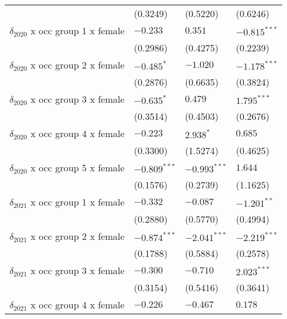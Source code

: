 \begin{tabular}{llll}
                                         &           (0.3249) &           (0.5220) &           (0.6246) \\
$\delta_{2020}$ x occ group 1 x female   &           $-0.233$ &            $0.351$ &     $-0.815^{***}$ \\
                                         &           (0.2986) &           (0.4275) &           (0.2239) \\
$\delta_{2020}$ x occ group 2 x female   &         $-0.485^*$ &           $-1.020$ &     $-1.178^{***}$ \\
                                         &           (0.2876) &           (0.6635) &           (0.3824) \\
$\delta_{2020}$ x occ group 3 x female   &         $-0.635^*$ &            $0.479$ &      $1.795^{***}$ \\
                                         &           (0.3514) &           (0.4503) &           (0.2676) \\
$\delta_{2020}$ x occ group 4 x female   &           $-0.223$ &          $2.938^*$ &            $0.685$ \\
                                         &           (0.3300) &           (1.5274) &           (0.4625) \\
$\delta_{2020}$ x occ group 5 x female   &     $-0.809^{***}$ &     $-0.993^{***}$ &            $1.644$ \\
                                         &           (0.1576) &           (0.2739) &           (1.1625) \\
$\delta_{2021}$ x occ group 1 x female   &           $-0.332$ &           $-0.087$ &      $-1.201^{**}$ \\
                                         &           (0.2880) &           (0.5770) &           (0.4994) \\
$\delta_{2021}$ x occ group 2 x female   &     $-0.874^{***}$ &     $-2.041^{***}$ &     $-2.219^{***}$ \\
                                         &           (0.1788) &           (0.5884) &           (0.2578) \\
$\delta_{2021}$ x occ group 3 x female   &           $-0.300$ &           $-0.710$ &      $2.023^{***}$ \\
                                         &           (0.3154) &           (0.5416) &           (0.3641) \\
$\delta_{2021}$ x occ group 4 x female   &           $-0.226$ &           $-0.467$ &            $0.178$ \\

\end{tabular}
